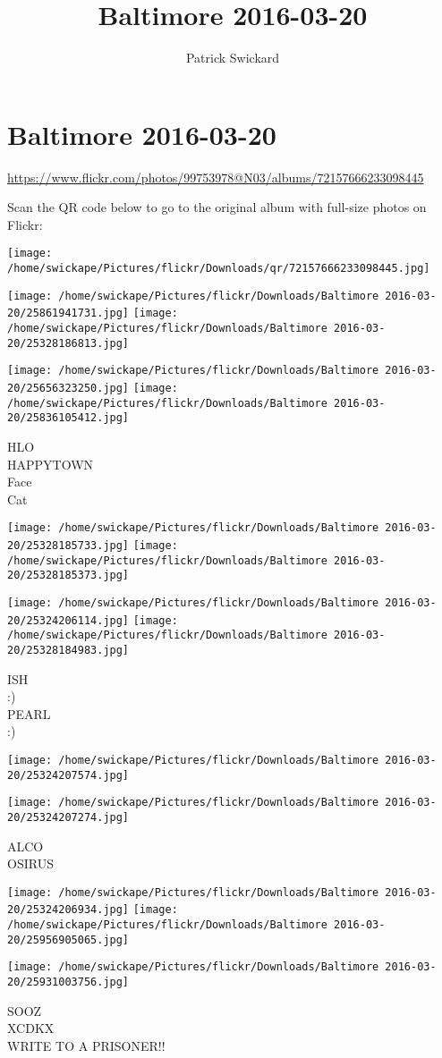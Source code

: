 \documentclass[10pt,letterpaper]{article}
\title{Baltimore 2016-03-20}
\author{Patrick Swickard}
\date{}
\begin{document}
\section*{Baltimore 2016-03-20}

\url{https://www.flickr.com/photos/99753978@N03/albums/72157666233098445}

Scan the QR code below to go to the original album with full-size photos on Flickr:

\texttt{[image: /home/swickape/Pictures/flickr/Downloads/qr/72157666233098445.jpg]}
\pagebreak

\texttt{[image: /home/swickape/Pictures/flickr/Downloads/Baltimore 2016-03-20/25861941731.jpg]}
\texttt{[image: /home/swickape/Pictures/flickr/Downloads/Baltimore 2016-03-20/25328186813.jpg]}

\texttt{[image: /home/swickape/Pictures/flickr/Downloads/Baltimore 2016-03-20/25656323250.jpg]}
\texttt{[image: /home/swickape/Pictures/flickr/Downloads/Baltimore 2016-03-20/25836105412.jpg]}

HLO\\
HAPPYTOWN\\
Face\\
Cat
\pagebreak

\texttt{[image: /home/swickape/Pictures/flickr/Downloads/Baltimore 2016-03-20/25328185733.jpg]}
\texttt{[image: /home/swickape/Pictures/flickr/Downloads/Baltimore 2016-03-20/25328185373.jpg]}

\texttt{[image: /home/swickape/Pictures/flickr/Downloads/Baltimore 2016-03-20/25324206114.jpg]}
\texttt{[image: /home/swickape/Pictures/flickr/Downloads/Baltimore 2016-03-20/25328184983.jpg]}

ISH\\
:)\\
PEARL\\
:)
\pagebreak

\texttt{[image: /home/swickape/Pictures/flickr/Downloads/Baltimore 2016-03-20/25324207574.jpg]}

\vspace{0.25in}
\texttt{[image: /home/swickape/Pictures/flickr/Downloads/Baltimore 2016-03-20/25324207274.jpg]}

ALCO\\
OSIRUS
\pagebreak

\texttt{[image: /home/swickape/Pictures/flickr/Downloads/Baltimore 2016-03-20/25324206934.jpg]}
\texttt{[image: /home/swickape/Pictures/flickr/Downloads/Baltimore 2016-03-20/25956905065.jpg]}

\texttt{[image: /home/swickape/Pictures/flickr/Downloads/Baltimore 2016-03-20/25931003756.jpg]}

SOOZ\\
XCDKX\\
WRITE TO A PRISONER!!
\pagebreak
\end{document}
